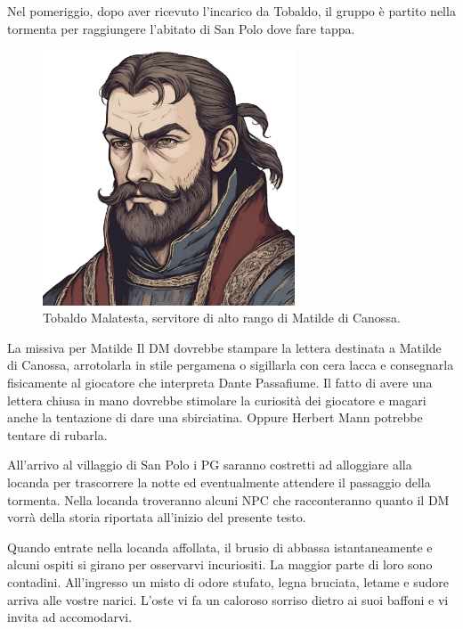 \documentclass[letterpaper,twocolumn,openany,nodeprecatedcode]{dndbook}
\begin{document}
Nel pomeriggio, dopo aver ricevuto l'incarico da Tobaldo, il gruppo è partito nella tormenta per raggiungere l'abitato di San Polo dove fare tappa.

\begin{figure}
\centering
\includegraphics[width=7.5cm]{img/tobaldo-malatesta.png}
    \caption{\textsf{Tobaldo Malatesta, servitore di alto rango di Matilde di Canossa.\cite{url:ai}}}
    \label{fig:tobaldo}
\end{figure}

\begin{DndSidebar}{La missiva per Matilde}
Il DM dovrebbe stampare la lettera destinata a Matilde di Canossa, arrotolarla in stile pergamena o sigillarla con cera lacca e consegnarla fisicamente al giocatore che interpreta Dante Passafiume. Il fatto di avere una lettera chiusa in mano dovrebbe stimolare la curiosità dei giocatore e magari anche la tentazione di dare una sbirciatina. Oppure Herbert Mann potrebbe tentare di rubarla.
\end{DndSidebar}

All'arrivo al villaggio di San Polo i PG saranno costretti ad alloggiare alla locanda per trascorrere la notte ed eventualmente attendere il passaggio della tormenta. Nella locanda troveranno alcuni NPC che racconteranno quanto il DM vorrà della storia riportata all'inizio del presente testo.

\begin{DndReadAloud}
Quando entrate nella locanda affollata, il brusio di abbassa istantaneamente e alcuni ospiti si girano per osservarvi incuriositi. La maggior parte di loro sono contadini. All'ingresso un misto di odore stufato, legna bruciata, letame e sudore arriva alle vostre narici. L'oste vi fa un caloroso sorriso dietro ai suoi baffoni e vi invita ad accomodarvi.
\end{DndReadAloud}
\end{document}
